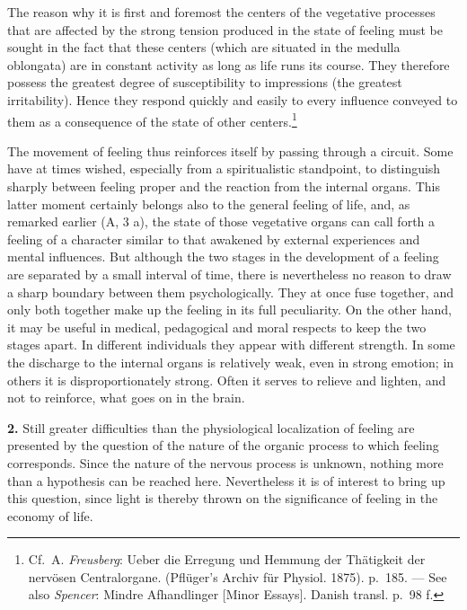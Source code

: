 \documentclass[12pt,a4paper]{book}
\newcommand{\opage}[1]{\marginnote{\footnotesize\textit{[#1]}}}
\begin{document}
The reason why it is first and foremost the centers of the vegetative
processes that are affected by the strong tension produced in the state
of feeling must be sought in the fact that these centers (which are
situated in the medulla oblongata) are in constant activity as long as
life runs its course. They therefore possess the greatest degree of
susceptibility to impressions (the greatest irritability). Hence they
respond quickly and easily to every influence conveyed to them as a
consequence of the state of other centers.\footnote{Cf.\ A.
\emph{Freusberg}: Ueber die Erregung und Hemmung der Thätigkeit der
nervösen Centralorgane. (Pflüger’s Archiv für Physiol. 1875). p.~185.
--- See also \emph{Spencer}: Mindre Afhandlinger [Minor Essays]. Danish transl. p.~98 f.}

The movement of feeling thus reinforces itself by passing through a
circuit. Some have at times wished, especially from a spiritualistic
standpoint, to distinguish sharply between feeling proper and the
reaction from the internal organs. This latter moment certainly belongs
also to the general feeling of life, and, as remarked earlier (A, 3 a),
the state of those vegetative organs can call forth a feeling of a
character similar to that awakened by external experiences and mental
influences. But although the two stages in the development of a feeling
are separated by a small interval of time, there is
\opage{322}nevertheless no reason to draw a sharp boundary between them
psychologically. They at once fuse together, and only both together make
up the feeling in its full peculiarity. On the other hand, it may be
useful in medical, pedagogical and moral respects to keep the two stages
apart. In different individuals they appear with different strength. In
some the discharge to the internal organs is relatively weak, even in
strong emotion; in others it is disproportionately strong. Often it
serves to relieve and lighten, and not to reinforce, what goes on in the
brain.

\textbf{2.} Still greater difficulties than the physiological
localization of feeling are presented by the question of the nature of
the organic process to which feeling corresponds. Since the nature of the
nervous process is unknown, nothing more than a hypothesis can be
reached here. Nevertheless it is of interest to bring up this question,
since light is thereby thrown on the significance of feeling in the
economy of life.
\end{document}
